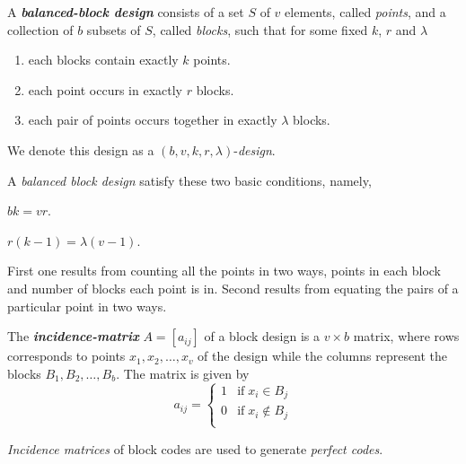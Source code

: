 \documentclass[../main.tex]{subfiles}
\begin{document}
\begin{defn}
	A \textbf{\emph{balanced-block design}} consists of a set $S$ of $v$ elements, called \emph{points}, and a collection of $b$ subsets of $S$, called \emph{blocks}, such that for some fixed $k$, $r$ and $\lambda$
	\begin{enumerate}
	\itemsep-1mm
		\item each blocks contain exactly $k$ points.
		\item each point occurs in exactly $r$ blocks.
		\item each pair of points occurs together in exactly $\lambda$ blocks.
	\end{enumerate}
	We denote this design as a $(b,v,k,r,\lambda)$-\emph{design}.
\end{defn}
A \emph{balanced block design} satisfy these two basic conditions, namely,\; 
\begin{enumerate*}[label=(\roman*), before=\unskip{}]
	\item $bk=vr$.
	\item $r(k-1)=\lambda(v-1)$.
\end{enumerate*}
First one results from counting all the points in two ways, points in each block and number of blocks each point is in.
Second results from equating the pairs of a particular point in two ways.
\begin{defn}
	The \textbf{\emph{incidence-matrix}} $A=[a_{ij}]$ of a block design is a $v\times b$ matrix, where rows corresponds to points $x_1,x_2,\ldots,x_v$ of the design while the columns represent the blocks $B_1,B_2,\ldots,B_b$. The matrix is given by
	\[
		a_{ij}=
		\begin{cases}
			1 & \text{if}\; x_i\in B_j \\
			0 & \text{if}\; x_i\notin B_j \\
		\end{cases}
	\]
	
\end{defn}
\emph{Incidence matrices} of block codes are used to generate \emph{perfect codes}.
\end{document}
